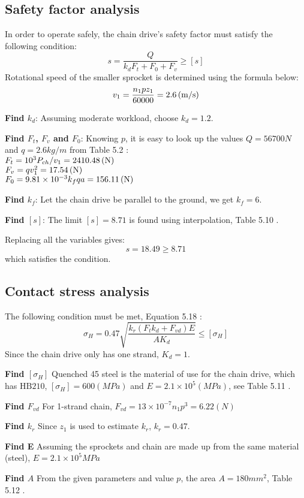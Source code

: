 \subsection{Safety factor analysis}
In order to operate safely, the chain drive's safety factor must satisfy the following condition:
\[s = \dfrac{Q}{k_dF_t+F_0+F_v} \geq [s]\]
Rotational speed of the smaller sprocket is determined using the formula below:
\[v_1=\dfrac{n_1pz_1}{60000}= 2.6 \, (\mathrm{m/s})\]

\textbf{Find $ k_d $}: Assuming moderate workload, choose $ k_d = 1.2 $.

\textbf{Find $ F_t $, $ F_v $ and $ F_0 $}: Knowing $ p $, it is easy to look up the values $ Q=56700 \unit{N}$ and $ q=2.6\unit{kg/m} $ from Table 5.2 \cite{tk1}:\\
$ F_t = {10^3P_{ch}}/{v_1} = 2410.48 \, (\mathrm{N}) $\\
$ F_v=qv_1^2= 17.54 \, (\mathrm{N}) $\\
$ F_0=9.81\times10^{-3}k_fqa = 156.11\, (\mathrm{N})$

\textbf{Find $ k_f $}: Let the chain drive be parallel to the ground, we get $ k_f = 6 $.

\textbf{Find $ [s] $}: The limit $ [s] =8.71$ is found using interpolation, Table 5.10 \cite{tk1}.

Replacing all the variables gives:
\[s=18.49\geq8.71\]
which satisfies the condition.
\subsection{Contact stress analysis}
The following condition must be met, Equation 5.18 \cite{tk1}:
\[\sigma_H = 0.47\sqrt{\dfrac{k_r(F_tk_d+F_{vd})E}{AK_d}}\leq[\sigma_H]\]
Since the chain drive only has one strand, $ K_d = 1$.

\textbf{Find $ [\sigma_H] $} Quenched 45 steel is the material of use for the chain drive, which has $ \text{HB}210 $, $ [\sigma_H] = 600 \unit{(MPa)} $ and $ E = 2.1\times10^5 \unit{(MPa)} $, see Table 5.11 \cite{tk1}.

\textbf{Find $ F_{vd} $} For 1-strand chain, $ F_{vd} = 13\times10^{-7}n_1p^3 = 6.22 \unit{(N)}$

\textbf{Find $ k_r $} Since $ z_1 $ is used to estimate $ k_r $, $ k_r= 0.47$.

\textbf{Find E} Assuming the sprockets and chain are made up from the same material (steel), $ E=2.1\times10^5\unit{MPa} $

\textbf{Find $ A $} From the given parameters and value $ p $, the area $ A = 180 \unit{mm^2} $, Table 5.12 \cite{tk1}.

